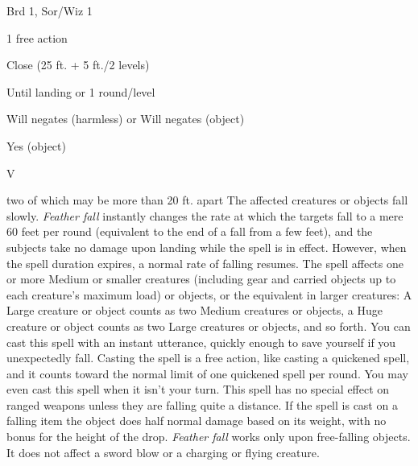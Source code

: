 
\begin{description*}
\item[Level:] Brd 1, Sor/Wiz 1
\item[Casting Time:] 1 free action
\item[Range:] Close (25 ft. + 5 ft./2 levels)
\item[Duration:] Until landing or 1 round/level
\item[Saving Throw:] Will negates (harmless) or Will negates (object)
\item[Spell Resistance:] Yes (object)
\item[Components:] V
\end{description*}

two of which may be more than 20 ft. apart
The affected creatures or objects fall slowly. \textit{Feather fall} instantly
changes the rate at which the targets fall to a mere 60 feet per round (equivalent
to the end of a fall from a few feet), and the subjects take no damage upon landing
while the spell is in effect. However, when the spell duration expires, a normal
rate of falling resumes.
The spell affects one or more Medium or smaller creatures (including gear and carried
objects up to each creature's maximum load) or objects, or the equivalent in larger
creatures: A Large creature or object counts as two Medium creatures or objects,
a Huge creature or object counts as two Large creatures or objects, and so forth.
You can cast this spell with an instant utterance, quickly enough to save yourself
if you unexpectedly fall. Casting the spell is a free action, like casting a quickened
spell, and it counts toward the normal limit of one quickened spell per round.
You may even cast this spell when it isn't your turn.
This spell has no special effect on ranged weapons unless they are falling quite
a distance. If the spell is cast on a falling item the object does half normal
damage based on its weight, with no bonus for the height of the drop.
\textit{Feather fall} works only upon free-falling objects. It does not affect
a sword blow or a charging or flying creature.